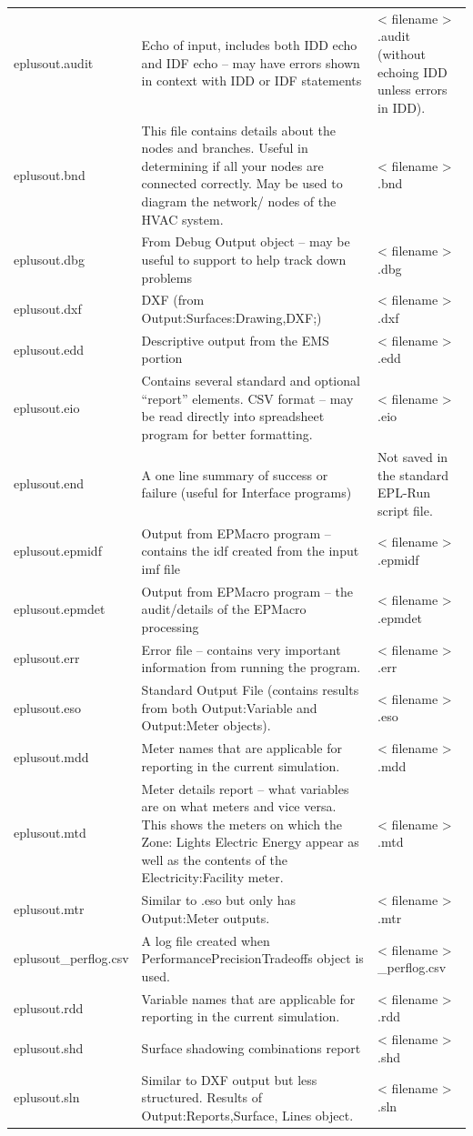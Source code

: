 \begin{longtable}[c]{p{1.5in}p{3.0in}p{1.5in}}
eplusout.audit & Echo of input, includes both IDD echo and IDF echo – may have errors shown in context with IDD or IDF statements & < filename > .audit (without echoing IDD unless errors in IDD). \tabularnewline
eplusout.bnd & This file contains details about the nodes and branches. Useful in determining if all your nodes are connected correctly. May be used to diagram the network/ nodes of the HVAC system. & < filename > .bnd \tabularnewline
eplusout.dbg & From Debug Output object – may be useful to support to help track down problems & < filename > .dbg \tabularnewline
eplusout.dxf & DXF (from Output:Surfaces:Drawing,DXF;) & < filename > .dxf \tabularnewline
eplusout.edd & Descriptive output from the EMS portion & < filename > .edd \tabularnewline
eplusout.eio & Contains several standard and optional “report” elements. CSV format – may be read directly into spreadsheet program for better formatting. & < filename > .eio \tabularnewline
eplusout.end & A one line summary of success or failure (useful for Interface programs) & Not saved in the standard EPL-Run script file. \tabularnewline
eplusout.epmidf & Output from EPMacro program – contains the idf created from the input imf file & < filename > .epmidf \tabularnewline
eplusout.epmdet & Output from EPMacro program – the audit/details of the EPMacro processing & < filename > .epmdet \tabularnewline
eplusout.err & Error file – contains very important information from running the program. & < filename > .err \tabularnewline
eplusout.eso & Standard Output File (contains results from both Output:Variable and Output:Meter objects). & < filename > .eso \tabularnewline
eplusout.mdd & Meter names that are applicable for reporting in the current simulation. & < filename > .mdd \tabularnewline
eplusout.mtd & Meter details report – what variables are on what meters and vice versa. This shows the meters on which the Zone: Lights Electric Energy appear as well as the contents of the Electricity:Facility meter. & < filename > .mtd \tabularnewline
eplusout.mtr & Similar to .eso but only has Output:Meter outputs. & < filename > .mtr \tabularnewline
eplusout\_perflog.csv & A log file created when PerformancePrecisionTradeoffs object is used. & < filename > \_perflog.csv \tabularnewline
eplusout.rdd & Variable names that are applicable for reporting in the current simulation. & < filename > .rdd \tabularnewline
eplusout.shd & Surface shadowing combinations report & < filename > .shd \tabularnewline
eplusout.sln & Similar to DXF output but less structured. Results of Output:Reports,Surface, Lines object. & < filename > .sln \tabularnewline

\end{longtable}
